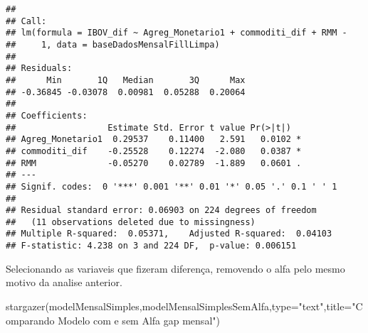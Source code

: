 \documentclass[
]{article}
\newenvironment{Shaded}{\begin{snugshade}}{\end{snugshade}}
\newcommand{\AttributeTok}[1]{\textcolor[rgb]{0.77,0.63,0.00}{#1}}
\newcommand{\FunctionTok}[1]{\textcolor[rgb]{0.00,0.00,0.00}{#1}}
\newcommand{\NormalTok}[1]{#1}
\newcommand{\StringTok}[1]{\textcolor[rgb]{0.31,0.60,0.02}{#1}}
\begin{document}
\begin{verbatim}
## 
## Call:
## lm(formula = IBOV_dif ~ Agreg_Monetario1 + commoditi_dif + RMM - 
##     1, data = baseDadosMensalFillLimpa)
## 
## Residuals:
##      Min       1Q   Median       3Q      Max 
## -0.36845 -0.03078  0.00981  0.05288  0.20064 
## 
## Coefficients:
##                  Estimate Std. Error t value Pr(>|t|)  
## Agreg_Monetario1  0.29537    0.11400   2.591   0.0102 *
## commoditi_dif    -0.25528    0.12274  -2.080   0.0387 *
## RMM              -0.05270    0.02789  -1.889   0.0601 .
## ---
## Signif. codes:  0 '***' 0.001 '**' 0.01 '*' 0.05 '.' 0.1 ' ' 1
## 
## Residual standard error: 0.06903 on 224 degrees of freedom
##   (11 observations deleted due to missingness)
## Multiple R-squared:  0.05371,    Adjusted R-squared:  0.04103 
## F-statistic: 4.238 on 3 and 224 DF,  p-value: 0.006151
\end{verbatim}

Selecionando as variaveis que fizeram diferença, removendo o alfa pelo
mesmo motivo da analise anterior.

\begin{Shaded}
\begin{Highlighting}[]
\FunctionTok{stargazer}\NormalTok{(modelMensalSimples,modelMensalSimplesSemAlfa,}\AttributeTok{type=}\StringTok{"text"}\NormalTok{,}\AttributeTok{title=}\StringTok{"Comparando Modelo com e sem Alfa gap mensal"}\NormalTok{)}
\end{Highlighting}
\end{Shaded}
\end{document}
